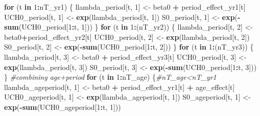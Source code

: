 \documentclass[11pt,]{article}
\newenvironment{Shaded}{\begin{snugshade}}{\end{snugshade}}
\newcommand{\KeywordTok}[1]{\textcolor[rgb]{0.13,0.29,0.53}{\textbf{#1}}}
\newcommand{\DecValTok}[1]{\textcolor[rgb]{0.00,0.00,0.81}{#1}}
\newcommand{\StringTok}[1]{\textcolor[rgb]{0.31,0.60,0.02}{#1}}
\newcommand{\CommentTok}[1]{\textcolor[rgb]{0.56,0.35,0.01}{\textit{#1}}}
\newcommand{\ControlFlowTok}[1]{\textcolor[rgb]{0.13,0.29,0.53}{\textbf{#1}}}
\newcommand{\OperatorTok}[1]{\textcolor[rgb]{0.81,0.36,0.00}{\textbf{#1}}}
\newcommand{\NormalTok}[1]{#1}
\begin{document}
\begin{Shaded}
\begin{Highlighting}[]
  \ControlFlowTok{for}\NormalTok{ (t }\ControlFlowTok{in} \DecValTok{1}\OperatorTok{:}\NormalTok{nT_yr1) \{}
\NormalTok{    llambda_period[t, }\DecValTok{1}\NormalTok{] <-}\StringTok{ }\NormalTok{beta0 }\OperatorTok{+}\StringTok{ }\NormalTok{period_effect_yr1[t]}
\NormalTok{    UCH0_period[t, }\DecValTok{1}\NormalTok{] <-}\StringTok{ }\KeywordTok{exp}\NormalTok{(llambda_period[t, }\DecValTok{1}\NormalTok{])}
\NormalTok{    S0_period[t, }\DecValTok{1}\NormalTok{] <-}\StringTok{ }\KeywordTok{exp}\NormalTok{(}\OperatorTok{-}\KeywordTok{sum}\NormalTok{(UCH0_period[}\DecValTok{1}\OperatorTok{:}\NormalTok{t, }\DecValTok{1}\NormalTok{]))}
\NormalTok{  \}}
  \ControlFlowTok{for}\NormalTok{ (t }\ControlFlowTok{in} \DecValTok{1}\OperatorTok{:}\NormalTok{(nT_yr2)) \{}
\NormalTok{    llambda_period[t, }\DecValTok{2}\NormalTok{] <-}\StringTok{ }\NormalTok{beta0}\OperatorTok{+}\NormalTok{period_effect_yr2[t]}
\NormalTok{    UCH0_period[t, }\DecValTok{2}\NormalTok{] <-}\StringTok{ }\KeywordTok{exp}\NormalTok{(llambda_period[t, }\DecValTok{2}\NormalTok{])}
\NormalTok{    S0_period[t, }\DecValTok{2}\NormalTok{] <-}\StringTok{ }\KeywordTok{exp}\NormalTok{(}\OperatorTok{-}\KeywordTok{sum}\NormalTok{(UCH0_period[}\DecValTok{1}\OperatorTok{:}\NormalTok{t, }\DecValTok{2}\NormalTok{]))}
\NormalTok{  \}}
  \ControlFlowTok{for}\NormalTok{ (t }\ControlFlowTok{in} \DecValTok{1}\OperatorTok{:}\NormalTok{(nT_yr3)) \{}
\NormalTok{    llambda_period[t, }\DecValTok{3}\NormalTok{] <-}\StringTok{ }\NormalTok{beta0 }\OperatorTok{+}\StringTok{ }\NormalTok{period_effect_yr3[t]}
\NormalTok{    UCH0_period[t, }\DecValTok{3}\NormalTok{] <-}\StringTok{ }\KeywordTok{exp}\NormalTok{(llambda_period[t, }\DecValTok{3}\NormalTok{])}
\NormalTok{    S0_period[t, }\DecValTok{3}\NormalTok{] <-}\StringTok{ }\KeywordTok{exp}\NormalTok{(}\OperatorTok{-}\KeywordTok{sum}\NormalTok{(UCH0_period[}\DecValTok{1}\OperatorTok{:}\NormalTok{t, }\DecValTok{3}\NormalTok{]))}
\NormalTok{  \}}
  \CommentTok{#combining age+period}
  \ControlFlowTok{for}\NormalTok{ (t }\ControlFlowTok{in} \DecValTok{1}\OperatorTok{:}\NormalTok{nT_age) \{}\CommentTok{#nT_age<nT_yr1}
\NormalTok{    llambda_ageperiod[t, }\DecValTok{1}\NormalTok{] <-}\StringTok{ }\NormalTok{beta0 }\OperatorTok{+}\StringTok{ }\NormalTok{period_effect_yr1[t] }\OperatorTok{+}\StringTok{ }\NormalTok{age_effect[t]}
\NormalTok{    UCH0_ageperiod[t, }\DecValTok{1}\NormalTok{] <-}\StringTok{ }\KeywordTok{exp}\NormalTok{(llambda_ageperiod[t, }\DecValTok{1}\NormalTok{])}
\NormalTok{    S0_ageperiod[t, }\DecValTok{1}\NormalTok{] <-}\StringTok{ }\KeywordTok{exp}\NormalTok{(}\OperatorTok{-}\KeywordTok{sum}\NormalTok{(UCH0_ageperiod[}\DecValTok{1}\OperatorTok{:}\NormalTok{t, }\DecValTok{1}\NormalTok{]))}

\end{Highlighting}
\end{Shaded}
\end{document}
